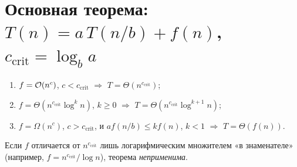 \documentclass{ca-handout}
\begin{document}
\section{Основная теорема: $T(n) = a\,T(n/b) + f(n)$, $c_{\mathrm{crit}} = \log_b a$}
\begin{enumerate}
  \item $f = \mathcal{O}(n^c)$, $c < c_{\mathrm{crit}}$ $\Rightarrow$ $T = \Theta(n^{c_{\mathrm{crit}}})$;
  \item $f = \Theta(n^{c_{\mathrm{crit}}} \log^k n)$, $k \ge 0$ $\Rightarrow$
    $T = \Theta(n^{c_{\mathrm{crit}}} \log^{k+1} n)$;
  \item $f = \Omega(n^c)$, $c > c_{\mathrm{crit}}$, и $a f(n/b) \le k f(n)$, $k < 1$ $\Rightarrow$
    $T = \Theta(f(n))$.
\end{enumerate}
Если $f$ отличается от $n^{c_{\mathrm{crit}}}$ лишь логарифмическим множителем «в знаменателе»
(например, $f = n^{c_{\mathrm{crit}}}/\log n$), теорема \emph{неприменима}.
\end{document}
